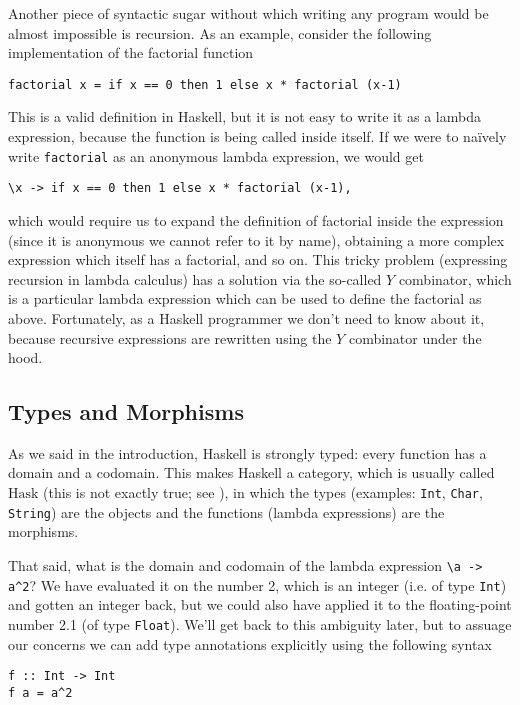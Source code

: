 \documentclass[11pt]{article}
\theoremstyle{nonumberplain}
\newcommand{\Hask}{\mathrm{Hask}}
\begin{document}
Another piece of syntactic sugar without which writing any program would be almost impossible is recursion. As an example, consider the following implementation of the factorial function
\begin{lstlisting}
factorial x = if x == 0 then 1 else x * factorial (x-1)
\end{lstlisting}

This is a valid definition in Haskell, but it is not easy to write it as a lambda expression, because the function is being called inside itself. If we were to naïvely write \lstinline|factorial| as an anonymous lambda expression, we would get
\begin{lstlisting}
\x -> if x == 0 then 1 else x * factorial (x-1),
\end{lstlisting}
which would require us to expand the definition of factorial inside the expression (since it is anonymous we cannot refer to it by name), obtaining a more complex expression which itself has a factorial, and so on. This tricky problem (expressing recursion in lambda calculus) has a solution via the so-called $Y$ combinator, which is a particular lambda expression which can be used to define the factorial as above. Fortunately, as a Haskell programmer we don't need to know about it, because recursive expressions are rewritten using the $Y$ combinator under the hood.

\subsection{Types and Morphisms}

As we said in the introduction, Haskell is strongly typed: every function has a domain and a codomain. This makes Haskell a category, which is usually called $\Hask$ (this is not exactly true; see \cite{haskisnotcat}), in which the types (examples: \lstinline|Int|, \lstinline|Char|, \lstinline|String|) are the objects and the functions (lambda expressions) are the morphisms.

That said, what is the domain and codomain of the lambda expression \lstinline|\a -> a^2|? We have evaluated it on the number 2, which is an integer (i.e. of type \lstinline|Int|) and gotten an integer back, but we could also have applied it to the floating-point number 2.1 (of type \lstinline|Float|). We'll get back to this ambiguity later, but to assuage our concerns we can add type annotations explicitly using the following syntax
\begin{lstlisting}
f :: Int -> Int
f a = a^2
\end{lstlisting}
\end{document}
